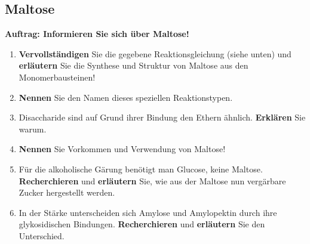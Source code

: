 \documentclass{scrartcl}  %
\begin{document}
		\subsection{Maltose}
		
			\textbf{Auftrag: Informieren Sie sich über Maltose!}
			\begin{enumerate}
    			\item \textbf{Vervollständigen} Sie die gegebene Reaktionsgleichung (siehe unten) und \textbf{erläutern} Sie die Synthese und Struktur von Maltose aus den Monomerbausteinen!
			    \item \textbf{Nennen} Sie den Namen dieses speziellen Reaktionstypen.
			    \item Disaccharide sind auf Grund ihrer Bindung den Ethern ähnlich. \textbf{Erklären} Sie warum.
			    \item \textbf{Nennen} Sie Vorkommen und Verwendung von Maltose!
			    \item Für die alkoholische Gärung benötigt man Glucose, keine Maltose. \textbf{Recherchieren} und \textbf{erläutern} Sie, wie aus der Maltose nun vergärbare Zucker hergestellt werden. 
			    \item In der Stärke unterscheiden sich Amylose und Amylopektin durch ihre glykosidischen Bindungen. \textbf{Recherchieren} und \textbf{erläutern} Sie den Unterschied.
			\end{enumerate}					
\end{document}
